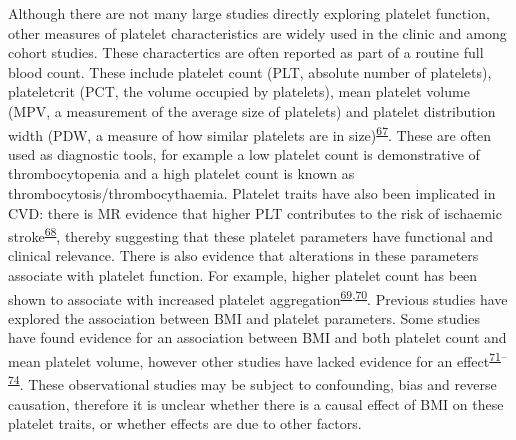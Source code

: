 \documentclass[11pt,twoside]{bristolthesis}
\begin{document}
Although there are not many large studies directly exploring platelet function, other measures of platelet characteristics are widely used in the clinic and among cohort studies. These charactertics are often reported as part of a routine full blood count. These include platelet count (PLT, absolute number of platelets), plateletcrit (PCT, the volume occupied by platelets), mean platelet volume (MPV, a measurement of the average size of platelets) and platelet distribution width (PDW, a measure of how similar platelets are in size)\textsuperscript{\protect\hyperlink{ref-Budak2016}{67}}. These are often used as diagnostic tools, for example a low platelet count is demonstrative of thrombocytopenia and a high platelet count is known as thrombocytosis/thrombocythaemia. Platelet traits have also been implicated in CVD: there is MR evidence that higher PLT contributes to the risk of ischaemic stroke\textsuperscript{\protect\hyperlink{ref-Gill2018}{68}}, thereby suggesting that these platelet parameters have functional and clinical relevance. There is also evidence that alterations in these parameters associate with platelet function. For example, higher platelet count has been shown to associate with increased platelet aggregation\textsuperscript{\protect\hyperlink{ref-Wurtz2012}{69},\protect\hyperlink{ref-Femia2013}{70}}. Previous studies have explored the association between BMI and platelet parameters. Some studies have found evidence for an association between BMI and both platelet count and mean platelet volume, however other studies have lacked evidence for an effect\textsuperscript{\protect\hyperlink{ref-Furuncuoglu2016}{71}--\protect\hyperlink{ref-Heffron2018}{74}}. These observational studies may be subject to confounding, bias and reverse causation, therefore it is unclear whether there is a causal effect of BMI on these platelet traits, or whether effects are due to other factors.
\end{document}

